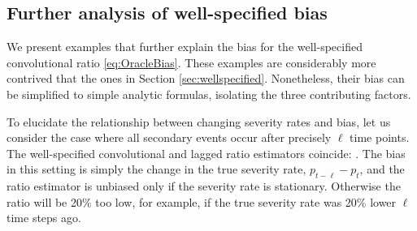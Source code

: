\documentclass{article}
\renewcommand{\hat}{\widehat} %
\begin{document}
\subsection{Further analysis of well-specified bias}
\label{apx:analysis}

We present examples that further explain the bias for the well-specified convolutional ratio \eqref{eq:OracleBias}. These examples are considerably more
contrived that the ones in Section \ref{sec:wellspecified}. Nonetheless, their bias can be simplified to 
simple analytic formulas, isolating the three contributing factors. 

To elucidate the relationship between changing severity rates and bias, let us
consider the case where all secondary events occur after precisely $\ell$ time  
points. The well-specified convolutional and lagged ratio estimators
coincide: \smash{$\hat{p}_t^\gamma = \hat{p}_t^\ell = p_{t-\ell}$}. The bias in
this setting is simply the change in the true severity rate, $p_{t-\ell} - p_t$, 
and the ratio estimator is unbiased only if the severity rate is stationary. 
Otherwise the ratio will be 20\% too low, for example, if the true severity rate was
20\% lower $\ell$ time steps ago. 
\end{document}
